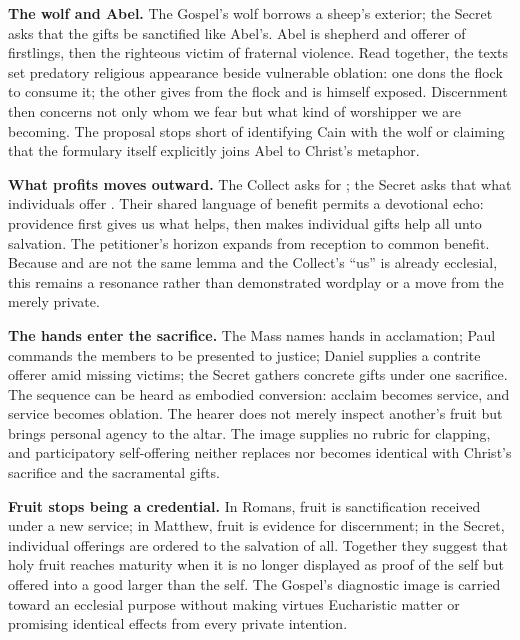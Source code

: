 \begin{deepstudy}
\noindent\textbf{The wolf and Abel.\enspace{}}
The Gospel's wolf borrows a sheep's exterior; the Secret asks that the gifts be sanctified like Abel's. Abel is shepherd and offerer of firstlings, then the righteous victim of fraternal violence. Read together, the texts set predatory religious appearance beside vulnerable oblation: one dons the flock to consume it; the other gives from the flock and is himself exposed. Discernment then concerns not only whom we fear but what kind of worshipper we are becoming. The proposal stops short of identifying Cain with the wolf or claiming that the formulary itself explicitly joins Abel to Christ's metaphor.

\noindent\textbf{What profits moves outward.\enspace{}}
The Collect asks for ; the Secret asks that what individuals offer . Their shared language of benefit permits a devotional echo: providence first gives us what helps, then makes individual gifts help all unto salvation. The petitioner's horizon expands from reception to common benefit. Because  and  are not the same lemma and the Collect's ``us'' is already ecclesial, this remains a resonance rather than demonstrated wordplay or a move from the merely private.

\noindent\textbf{The hands enter the sacrifice.\enspace{}}
The Mass names hands in acclamation; Paul commands the members to be presented to justice; Daniel supplies a contrite offerer amid missing victims; the Secret gathers concrete gifts under one sacrifice. The sequence can be heard as embodied conversion: acclaim becomes service, and service becomes oblation. The hearer does not merely inspect another's fruit but brings personal agency to the altar. The image supplies no rubric for clapping, and participatory self-offering neither replaces nor becomes identical with Christ's sacrifice and the sacramental gifts.

\noindent\textbf{Fruit stops being a credential.\enspace{}}
In Romans, fruit is sanctification received under a new service; in Matthew, fruit is evidence for discernment; in the Secret, individual offerings are ordered to the salvation of all. Together they suggest that holy fruit reaches maturity when it is no longer displayed as proof of the self but offered into a good larger than the self. The Gospel's diagnostic image is carried toward an ecclesial purpose without making virtues Eucharistic matter or promising identical effects from every private intention.


\end{deepstudy}
